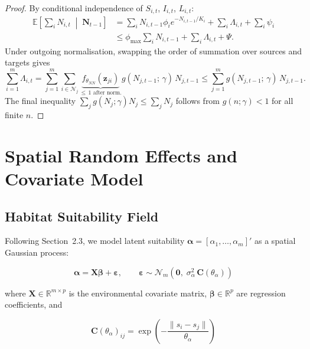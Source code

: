 \documentclass[12pt,a4paper]{article}
\theoremstyle{definition}
\newcommand{\E}{\mathbb{E}}
\newcommand{\N}{\mathcal{N}}
\newcommand{\bz}{\bm{z}}
\newcommand{\bX}{\bm{X}}
\newcommand{\bbeta}{\bm{\beta}}
\newcommand{\balpha}{\bm{\alpha}}
\newcommand{\bepsilon}{\bm{\varepsilon}}
\begin{document}
\begin{proof}
By conditional independence of $S_{i,t}$, $I_{i,t}$, $L_{i,t}$:
\begin{align*}
  \E\!\left[\sum_i N_{i,t}\;\middle|\;\mathbf{N}_{t-1}\right]
  &= \sum_i N_{i,t-1}\phi_i e^{-N_{i,t-1}/K_i}
     + \sum_i \Lambda_{i,t}
     + \sum_i \psi_i \\
  &\leq \phi_{\max}\sum_i N_{i,t-1}
     + \sum_i \Lambda_{i,t}
     + \Psi.
\end{align*}
Under outgoing normalisation, swapping the order of summation over sources
and targets gives
\[
  \sum_{i=1}^m \Lambda_{i,t}
  = \sum_{j=1}^m \sum_{i\in\mathcal{N}_j}
    \underbrace{f_{\theta_{NN}}(\bz_{ji})}_{\leq\,1\text{ after norm.}}
    g(N_{j,t-1};\,\gamma)\,N_{j,t-1}
  \leq \sum_{j=1}^m g(N_{j,t-1};\,\gamma)\,N_{j,t-1}.
\]
The final inequality $\sum_j g(N_j;\gamma)N_j \leq \sum_j N_j$ follows from
$g(n;\gamma) < 1$ for all finite $n$.
\end{proof}

\section{Spatial Random Effects and Covariate Model}
\label{sec:spatial}

\subsection{Habitat Suitability Field}

Following \citet{hooten2010} Section~2.3, we model latent suitability
$\balpha = [\alpha_1,\ldots,\alpha_m]'$ as a spatial Gaussian process:

\begin{equation}
  \balpha = \bX\bbeta + \bepsilon,
  \qquad
  \bepsilon \sim \N_m\!\left(\mathbf{0},\; \sigma_\alpha^2\, \mathbf{C}(\theta_\alpha)\right)
  \label{eq:habitat-gp}
\end{equation}

where $\bX \in \mathbb{R}^{m\times p}$ is the environmental covariate matrix,
$\bbeta \in \mathbb{R}^p$ are regression coefficients, and

\begin{equation}
  \mathbf{C}(\theta_\alpha)_{ij}
  = \exp\!\left(-\frac{\|s_i - s_j\|}{\theta_\alpha}\right)
  \label{eq:spatial-corr}
\end{equation}
\end{document}
